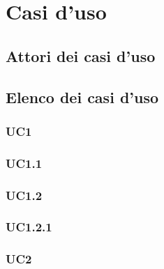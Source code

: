 \documentclass[AnalisiDeiRequisiti.tex]{subfiles}
\begin{document}
\chapter{Casi d'uso}
\section{Attori dei casi d'uso}
\section{Elenco dei casi d'uso}
\subsection{UC1}
\subsection{UC1.1}
\subsection{UC1.2}
\subsection{UC1.2.1}
\subsection{UC2}
\end{document}
